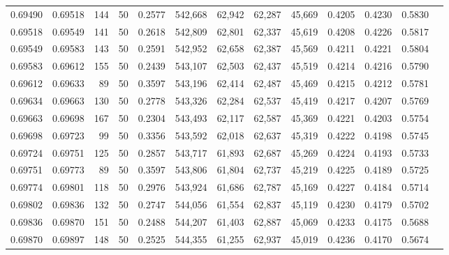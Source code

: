 \begin{tabular}{rrrrrrrrrrrrr}
0.69490 & 0.69518 &   144 &  50 &                                     0.2577 & 542,668 &  62,942 &  62,287 &  45,669 & 0.4205 & 0.4230 & 0.5830 \\
0.69518 & 0.69549 &   141 &  50 &                                     0.2618 & 542,809 &  62,801 &  62,337 &  45,619 & 0.4208 & 0.4226 & 0.5817 \\
0.69549 & 0.69583 &   143 &  50 &                                     0.2591 & 542,952 &  62,658 &  62,387 &  45,569 & 0.4211 & 0.4221 & 0.5804 \\
0.69583 & 0.69612 &   155 &  50 &                                     0.2439 & 543,107 &  62,503 &  62,437 &  45,519 & 0.4214 & 0.4216 & 0.5790 \\
0.69612 & 0.69633 &    89 &  50 &                                     0.3597 & 543,196 &  62,414 &  62,487 &  45,469 & 0.4215 & 0.4212 & 0.5781 \\
0.69634 & 0.69663 &   130 &  50 &                                     0.2778 & 543,326 &  62,284 &  62,537 &  45,419 & 0.4217 & 0.4207 & 0.5769 \\
0.69663 & 0.69698 &   167 &  50 &                                     0.2304 & 543,493 &  62,117 &  62,587 &  45,369 & 0.4221 & 0.4203 & 0.5754 \\
0.69698 & 0.69723 &    99 &  50 &                                     0.3356 & 543,592 &  62,018 &  62,637 &  45,319 & 0.4222 & 0.4198 & 0.5745 \\
0.69724 & 0.69751 &   125 &  50 &                                     0.2857 & 543,717 &  61,893 &  62,687 &  45,269 & 0.4224 & 0.4193 & 0.5733 \\
0.69751 & 0.69773 &    89 &  50 &                                     0.3597 & 543,806 &  61,804 &  62,737 &  45,219 & 0.4225 & 0.4189 & 0.5725 \\
0.69774 & 0.69801 &   118 &  50 &                                     0.2976 & 543,924 &  61,686 &  62,787 &  45,169 & 0.4227 & 0.4184 & 0.5714 \\
0.69802 & 0.69836 &   132 &  50 &                                     0.2747 & 544,056 &  61,554 &  62,837 &  45,119 & 0.4230 & 0.4179 & 0.5702 \\
0.69836 & 0.69870 &   151 &  50 &                                     0.2488 & 544,207 &  61,403 &  62,887 &  45,069 & 0.4233 & 0.4175 & 0.5688 \\
0.69870 & 0.69897 &   148 &  50 &                                     0.2525 & 544,355 &  61,255 &  62,937 &  45,019 & 0.4236 & 0.4170 & 0.5674 \\

\end{tabular}

